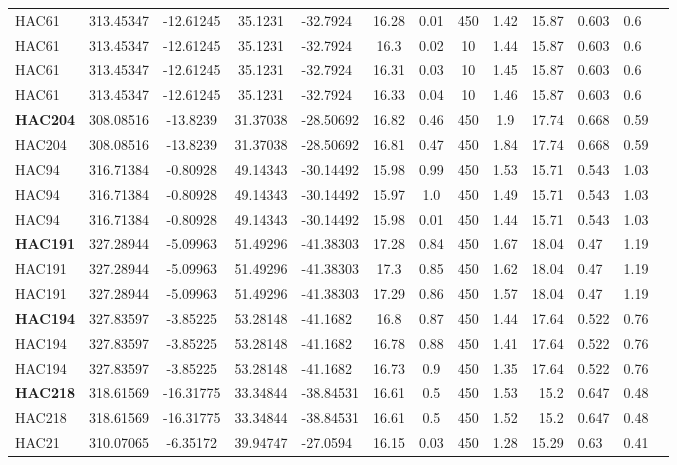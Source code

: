 \documentclass[a4paper,12pt]{article}
\begin{document}
\begin{longtable}{@{\extracolsep{\fill}}lccclccccrlll@{}}
HAC61 & 313.45347 & -12.61245 & 35.1231 & -32.7924 & 16.28 & 0.01 & 450 & 1.42 & 15.87 & 0.603 & 0.6 \\
HAC61 & 313.45347 & -12.61245 & 35.1231 & -32.7924 & 16.3 & 0.02 & 10 & 1.44 & 15.87 & 0.603 & 0.6 \\
HAC61 & 313.45347 & -12.61245 & 35.1231 & -32.7924 & 16.31 & 0.03 & 10 & 1.45 & 15.87 & 0.603 & 0.6 \\
HAC61 & 313.45347 & -12.61245 & 35.1231 & -32.7924 & 16.33 & 0.04 & 10 & 1.46 & 15.87 & 0.603 & 0.6 \\
\textbf{HAC204} & 308.08516 & -13.8239 & 31.37038 & -28.50692 & 16.82 & 0.46 & 450 & 1.9 & 17.74 & 0.668 & 0.59 \\
HAC204 & 308.08516 & -13.8239 & 31.37038 & -28.50692 & 16.81 & 0.47 & 450 & 1.84 & 17.74 & 0.668 & 0.59 \\
HAC94 & 316.71384 & -0.80928 & 49.14343 & -30.14492 & 15.98 & 0.99 & 450 & 1.53 & 15.71 & 0.543 & 1.03 \\
HAC94 & 316.71384 & -0.80928 & 49.14343 & -30.14492 & 15.97 & 1.0 & 450 & 1.49 & 15.71 & 0.543 & 1.03 \\
HAC94 & 316.71384 & -0.80928 & 49.14343 & -30.14492 & 15.98 & 0.01 & 450 & 1.44 & 15.71 & 0.543 & 1.03 \\
\textbf{HAC191} & 327.28944 & -5.09963 & 51.49296 & -41.38303 & 17.28 & 0.84 & 450 & 1.67 & 18.04 & 0.47 & 1.19 \\
HAC191 & 327.28944 & -5.09963 & 51.49296 & -41.38303 & 17.3 & 0.85 & 450 & 1.62 & 18.04 & 0.47 & 1.19 \\
HAC191 & 327.28944 & -5.09963 & 51.49296 & -41.38303 & 17.29 & 0.86 & 450 & 1.57 & 18.04 & 0.47 & 1.19 \\
\textbf{HAC194} & 327.83597 & -3.85225 & 53.28148 & -41.1682 & 16.8 & 0.87 & 450 & 1.44 & 17.64 & 0.522 & 0.76 \\
HAC194 & 327.83597 & -3.85225 & 53.28148 & -41.1682 & 16.78 & 0.88 & 450 & 1.41 & 17.64 & 0.522 & 0.76 \\
HAC194 & 327.83597 & -3.85225 & 53.28148 & -41.1682 & 16.73 & 0.9 & 450 & 1.35 & 17.64 & 0.522 & 0.76 \\
\textbf{HAC218} & 318.61569 & -16.31775 & 33.34844 & -38.84531 & 16.61 & 0.5 & 450 & 1.53 & 15.2 & 0.647 & 0.48 \\
HAC218 & 318.61569 & -16.31775 & 33.34844 & -38.84531 & 16.61 & 0.5 & 450 & 1.52 & 15.2 & 0.647 & 0.48 \\
HAC21 & 310.07065 & -6.35172 & 39.94747 & -27.0594 & 16.15 & 0.03 & 450 & 1.28 & 15.29 & 0.63 & 0.41 \\

\end{longtable}
\end{document}
